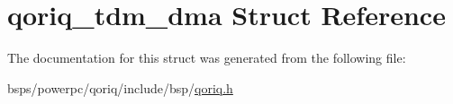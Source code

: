 \hypertarget{structqoriq__tdm__dma}{}\section{qoriq\+\_\+tdm\+\_\+dma Struct Reference}
\label{structqoriq__tdm__dma}


The documentation for this struct was generated from the following file\+:\begin{DoxyCompactItemize}
\item 
bsps/powerpc/qoriq/include/bsp/\mbox{\hyperlink{qoriq_8h}{qoriq.\+h}}\end{DoxyCompactItemize}
